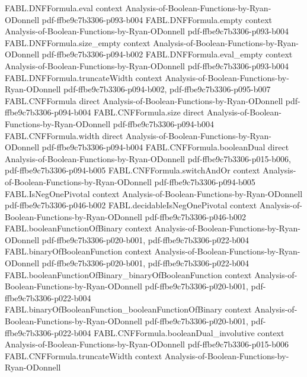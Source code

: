 \begin{theorem}
\proofstep
  {FABL.DNFFormula.eval}
  {context}
  {Analysis-of-Boolean-Functions-by-Ryan-ODonnell}
  {pdf-ffbe9c7b3306-p093-b004}
\proofstep
  {FABL.DNFFormula.empty}
  {context}
  {Analysis-of-Boolean-Functions-by-Ryan-ODonnell}
  {pdf-ffbe9c7b3306-p093-b004}
\proofstep
  {FABL.DNFFormula.size_empty}
  {context}
  {Analysis-of-Boolean-Functions-by-Ryan-ODonnell}
  {pdf-ffbe9c7b3306-p094-b002}
\proofstep
  {FABL.DNFFormula.eval_empty}
  {context}
  {Analysis-of-Boolean-Functions-by-Ryan-ODonnell}
  {pdf-ffbe9c7b3306-p093-b004}
\proofstep
  {FABL.DNFFormula.truncateWidth}
  {context}
  {Analysis-of-Boolean-Functions-by-Ryan-ODonnell}
  {pdf-ffbe9c7b3306-p094-b002,
    pdf-ffbe9c7b3306-p095-b007}
\proofstep
  {FABL.CNFFormula}
  {direct}
  {Analysis-of-Boolean-Functions-by-Ryan-ODonnell}
  {pdf-ffbe9c7b3306-p094-b004}
\proofstep
  {FABL.CNFFormula.size}
  {direct}
  {Analysis-of-Boolean-Functions-by-Ryan-ODonnell}
  {pdf-ffbe9c7b3306-p094-b004}
\proofstep
  {FABL.CNFFormula.width}
  {direct}
  {Analysis-of-Boolean-Functions-by-Ryan-ODonnell}
  {pdf-ffbe9c7b3306-p094-b004}
\proofstep
  {FABL.CNFFormula.booleanDual}
  {direct}
  {Analysis-of-Boolean-Functions-by-Ryan-ODonnell}
  {pdf-ffbe9c7b3306-p015-b006,
    pdf-ffbe9c7b3306-p094-b005}
\proofstep
  {FABL.CNFFormula.switchAndOr}
  {context}
  {Analysis-of-Boolean-Functions-by-Ryan-ODonnell}
  {pdf-ffbe9c7b3306-p094-b005}
\proofstep
  {FABL.IsNegOnePivotal}
  {context}
  {Analysis-of-Boolean-Functions-by-Ryan-ODonnell}
  {pdf-ffbe9c7b3306-p046-b002}
\proofstep
  {FABL.decidableIsNegOnePivotal}
  {context}
  {Analysis-of-Boolean-Functions-by-Ryan-ODonnell}
  {pdf-ffbe9c7b3306-p046-b002}
\proofstep
  {FABL.booleanFunctionOfBinary}
  {context}
  {Analysis-of-Boolean-Functions-by-Ryan-ODonnell}
  {pdf-ffbe9c7b3306-p020-b001,
    pdf-ffbe9c7b3306-p022-b004}
\proofstep
  {FABL.binaryOfBooleanFunction}
  {context}
  {Analysis-of-Boolean-Functions-by-Ryan-ODonnell}
  {pdf-ffbe9c7b3306-p020-b001,
    pdf-ffbe9c7b3306-p022-b004}
\proofstep
  {FABL.booleanFunctionOfBinary_binaryOfBooleanFunction}
  {context}
  {Analysis-of-Boolean-Functions-by-Ryan-ODonnell}
  {pdf-ffbe9c7b3306-p020-b001,
    pdf-ffbe9c7b3306-p022-b004}
\proofstep
  {FABL.binaryOfBooleanFunction_booleanFunctionOfBinary}
  {context}
  {Analysis-of-Boolean-Functions-by-Ryan-ODonnell}
  {pdf-ffbe9c7b3306-p020-b001,
    pdf-ffbe9c7b3306-p022-b004}
\proofstep
  {FABL.CNFFormula.booleanDual_involutive}
  {context}
  {Analysis-of-Boolean-Functions-by-Ryan-ODonnell}
  {pdf-ffbe9c7b3306-p015-b006}
\proofstep
  {FABL.CNFFormula.truncateWidth}
  {context}
  {Analysis-of-Boolean-Functions-by-Ryan-ODonnell}

\end{theorem}
